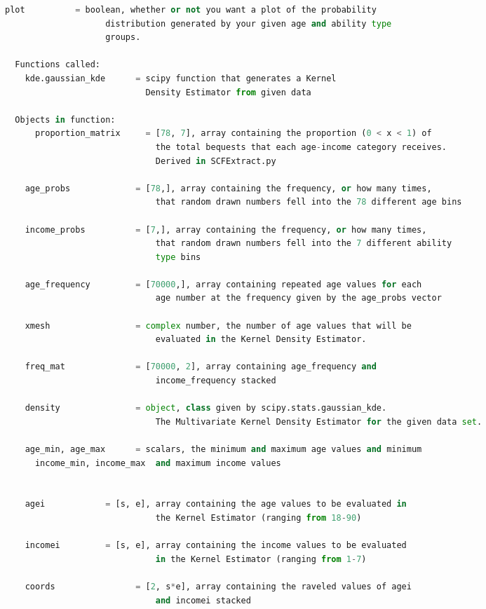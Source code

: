 \documentclass[letterpaper,12pt]{article}
\theoremstyle{definition}
\begin{document}
\begin{spacing}{1.5}
\begin{lstlisting}[language=Python, caption=MVKDE.py]
      plot          = boolean, whether or not you want a plot of the probability
                    distribution generated by your given age and ability type 
                    groups.
     
  Functions called: 
    kde.gaussian_kde      = scipy function that generates a Kernel 
                            Density Estimator from given data

  Objects in function:
      proportion_matrix     = [78, 7], array containing the proportion (0 < x < 1) of 
                              the total bequests that each age-income category receives. 
                              Derived in SCFExtract.py

    age_probs             = [78,], array containing the frequency, or how many times, 
                              that random drawn numbers fell into the 78 different age bins

    income_probs          = [7,], array containing the frequency, or how many times, 
                              that random drawn numbers fell into the 7 different ability 
                              type bins

    age_frequency         = [70000,], array containing repeated age values for each 
                              age number at the frequency given by the age_probs vector 

    xmesh                 = complex number, the number of age values that will be 
                              evaluated in the Kernel Density Estimator.

    freq_mat              = [70000, 2], array containing age_frequency and 
                              income_frequency stacked

    density               = object, class given by scipy.stats.gaussian_kde. 
                              The Multivariate Kernel Density Estimator for the given data set.

    age_min, age_max      = scalars, the minimum and maximum age values and minimum 
      income_min, income_max  and maximum income values 
    

    agei            = [s, e], array containing the age values to be evaluated in 
                              the Kernel Estimator (ranging from 18-90)

    incomei         = [s, e], array containing the income values to be evaluated 
                              in the Kernel Estimator (ranging from 1-7)

    coords                = [2, s*e], array containing the raveled values of agei 
                              and incomei stacked


\end{lstlisting}
\end{spacing}
\end{document}
